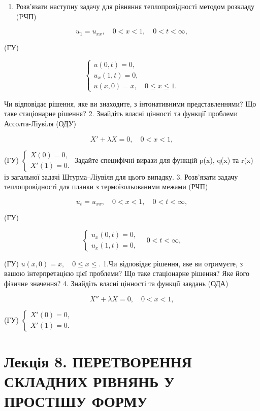 \documentclass[
  ukrainian,
]{article}
\providecommand{\tightlist}{%
  \setlength{\itemsep}{0pt}\setlength{\parskip}{0pt}}
\begin{document}
\begin{enumerate}
\def\labelenumi{\arabic{enumi}.}
\tightlist
\item
  Розв'язати наступну задачу для рівняння теплопровідності методом
  розкладу (PЧП)
\end{enumerate}

\[
u_1 = u_{xx}, \quad 0 < x < 1, \quad 0 < t < \infty,
\]

(ГУ)

\[
\begin{cases} u(0, t) = 0, \\ u_x(1, t) = 0, \\ u(x, 0) = x, \quad 0 \le x \le 1. \end{cases}
\]

Чи відповідає рішення, яке ви знаходите, з інтонативними
представленнями? Що таке стаціонарне рішення? 2. Знайдіть власні
цінності та функції проблеми Ассолта-Ліувіля (ОДУ)

\[
X' + \lambda X = 0, \quad 0 < x < 1,
\]

(ГУ) \(\begin{cases} X(0) = 0, \\ X'(1) = 0. \end{cases}\) Задайте
специфічні вирази для функцій p(x), q(x) та r(x) із загальної задачі
Штурма--Ліувіля для цього випадку. 3. Розв'язати задачу теплопровідності
для планки з термоізольованими межами (РЧП)

\[
u_t = u_{xx}, \quad 0 < x < 1, \quad 0 < t < \infty,
\]

(ГУ)

\[
\begin{cases} u_x (0, t) = 0, \\ u_x (1, t) = 0, \end{cases} \quad 0 < t < \infty,
\]

(ГУ) \(u(x, 0) = x, \quad 0 \le x \le.\) 1.Чи відповідає рішення, яке ви
отримуєте, з вашою інтерпретацією цієї проблеми? Що таке стаціонарне
рішення? Яке його фізичне значення? 4. Знайдіть власні цінності та
функції завдань (ОДА)

\[
X'' + \lambda X = 0, \quad 0 < x < 1,
\]

(ГУ) \(\begin{cases} X'(0) = 0, \\ X'(1) = 0. \end{cases}\)

\section{Лекція 8. ПЕРЕТВОРЕННЯ СКЛАДНИХ РІВНЯНЬ У ПРОСТІШУ
ФОРМУ}\label{ux43bux435ux43aux446ux456ux44f-8.-ux43fux435ux440ux435ux442ux432ux43eux440ux435ux43dux43dux44f-ux441ux43aux43bux430ux434ux43dux438ux445-ux440ux456ux432ux43dux44fux43dux44c-ux443-ux43fux440ux43eux441ux442ux456ux448ux443-ux444ux43eux440ux43cux443}
\end{document}
